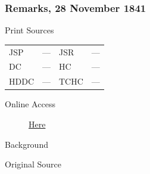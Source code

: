 		\subsubsection{Remarks, 28 November 1841}
			\label{EMS-1841-JS-28-NOV-1841}
				
			\begin{description}
				\item[Print Sources]
			\end{description}	

			\begin{tabular}{p{0.5in}p{1in}p{0.5in}p{1in}}
				JSP	 	& ---		& JSR 		& --- \\
				DC	 	& ---		& HC 		& --- \\
				HDDC 	& ---		& TCHC 		& --- \\
			\end{tabular}
			
			\begin{description}
				\item[Online Access] \href{https://www.josephsmithpapers.org/paper-summary/remarks-28-november-1841/1}{Here}
			\end{description}
			
			\begin{description}
				\item[Background]
			\end{description}
			
			
			\begin{description}
				\item[Original Source]
			\end{description}
			
			
